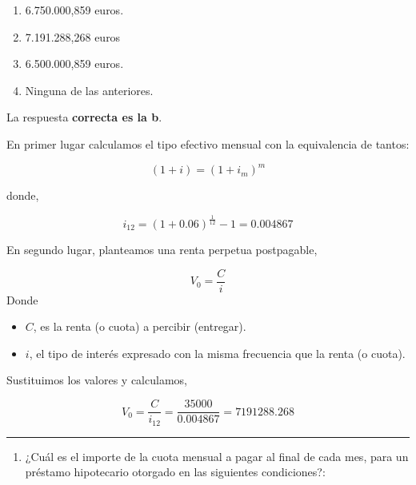 \documentclass[
  letterpaper,
  DIV=11,
  numbers=noendperiod]{scrreprt}
\providecommand{\tightlist}{%
  \setlength{\itemsep}{0pt}\setlength{\parskip}{0pt}}\usepackage{longtable,booktabs,array}
\begin{document}
\begin{enumerate}
\def\labelenumi{\alph{enumi}.}
\item
  6.750.000,859 euros.
\item
  7.191.288,268 euros
\item
  6.500.000,859 euros.
\item
  Ninguna de las anteriores.
\end{enumerate}

\begin{tcolorbox}[enhanced jigsaw, left=2mm, opacityback=0, colback=white, breakable, arc=.35mm, bottomrule=.15mm, rightrule=.15mm, toprule=.15mm, leftrule=.75mm, colframe=quarto-callout-tip-color-frame]
\begin{minipage}[t]{5.5mm}
\textcolor{quarto-callout-tip-color}{\faLightbulb}
\end{minipage}%
\begin{minipage}[t]{\textwidth - 5.5mm}

La respuesta \textbf{correcta es la b}.

En primer lugar calculamos el tipo efectivo mensual con la equivalencia
de tantos:

\[(1+i)=(1+ i _m)^m\]

donde,

\[i_{12}=(1+0.06)^{\frac{1}{12}}-1=0.004867\]

En segundo lugar, planteamos una renta perpetua postpagable,

\[V_0=\frac{C}{i}\] Donde

\begin{itemize}
\item
  \(C\), es la renta (o cuota) a percibir (entregar).
\item
  \(i\), el tipo de interés expresado con la misma frecuencia que la
  renta (o cuota).
\end{itemize}

Sustituimos los valores y calculamos,

\[V_0=\frac{C}{i_{12}}=\frac{35000}{0.004867}=7191288.268\]

\end{minipage}%
\end{tcolorbox}

\begin{center}\rule{0.5\linewidth}{0.5pt}\end{center}

\begin{enumerate}
\def\labelenumi{\arabic{enumi}.}
\setcounter{enumi}{91}
\tightlist
\item
  ¿Cuál es el importe de la cuota mensual a pagar al final de cada mes,
  para un préstamo hipotecario otorgado en las siguientes condiciones?:
\end{enumerate}
\end{document}
